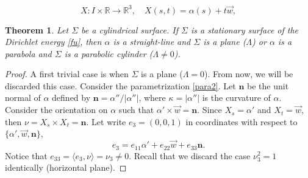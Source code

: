\documentclass[10pt,a4paper]{amsart}
\newtheorem{theorem}{Theorem}
\def\n{\mathbf n}
\def\r{\mathbb R}
\begin{document}
\begin{equation}\label{para2}
X\colon I\times\r\to\r^3,\quad X(s,t)=\alpha(s)+t\vec{w},
\end{equation}

\begin{theorem} \label{t2}
Let $\Sigma$ be a cylindrical surface. If $\Sigma$ is a stationary surface of the Dirichlet energy \eqref{fu}, then $\alpha$ is a straight-line and $\Sigma$ is a plane ($\Lambda$) or $\alpha$ is a parabola and $\Sigma$ is a parabolic cylinder ($\Lambda\not=0$).
\end{theorem}

\begin{proof}
A first trivial case is when $\Sigma$ is a plane ($\Lambda=0$). From now, we will be discarded this case.   Consider the parametrization \eqref{para2}. Let $\n$ be the unit normal of $\alpha$ defined by $\n=\alpha''/|\alpha''|$, where $\kappa=|\alpha''|$ is the curvature of $\alpha$. Consider the orientation on  $\alpha$ such that $\alpha'\times \vec{w}=\n$. Since $X_s=\alpha'$ and $X_t=\vec{w}$, then $\nu=X_s\times X_t=\n$. Let write $e_3=(0,0,1)$ in coordinates with respect to $\{\alpha',\vec{w},\n\}$, 
$$e_3=e_{11}\alpha'+e_{22} \vec{w}+e_{33}\n.$$
Notice that $e_{33}=\langle e_3,\nu\rangle=\nu_3\not=0$.  
Recall that we discard the case $\nu_3^2= 1$ identically (horizontal plane). 


\end{proof}
\end{document}
